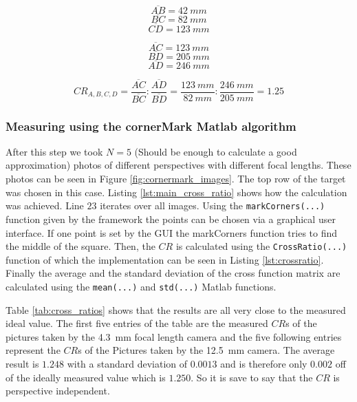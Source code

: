 \documentclass[
a4paper,     %
12pt         %
]{scrartcl}  %
\begin{document}
\begin{minipage}{0.48\textwidth}
  $$\overline{AB} = \SI{42}{mm}$$
  $$\overline{BC} = \SI{82}{mm}$$
  $$\overline{CD} = \SI{123}{mm}$$
\end{minipage}
\begin{minipage}{0.48\textwidth}
  $$\overline{AC} = \SI{123}{mm}$$
  $$\overline{BD} = \SI{205}{mm}$$
  $$\overline{AD} = \SI{246}{mm}$$
\end{minipage}

\hspace{0.5mm}

\begin{equation}
 CR_{A,B,C,D} = \frac{\overline{AC}}{\overline{BC}} : \frac{\overline{AD}}{\overline{BD}} = \frac{\SI{123}{mm}}{\SI{82}{mm}} : \frac{\SI{246}{mm}}{\SI{205}{mm}} = 1.25
 \label{eq:measure_by_hand}
\end{equation}

\subsubsection{Measuring using the cornerMark Matlab algorithm}

After this step we took $N = 5$ (Should be enough to calculate a good approximation) photos of different perspectives with different focal lengths.
These photos can be seen in Figure \ref{fig:cornermark_images}.
The top row of the target was chosen in this case.
Listing \ref{lst:main_cross_ratio} shows how the calculation was achieved.
Line $23$ iterates over all images.
Using the \lstinline{markCorners(...)} function given by the framework the points can be chosen via a graphical user interface.
If one point is set by the GUI the markCorners function tries to find the middle of the square.
Then, the $CR$ is calculated using the \lstinline{CrossRatio(...)} function of which the implementation can be seen in Listing \ref{lst:crossratio}.
Finally the average and the standard deviation of the cross function matrix are calculated using the \lstinline{mean(...)} and \lstinline{std(...)} Matlab functions.





Table \ref{tab:cross_ratios} shows that the results are all very close to the measured ideal value.
The first five entries of the table are the measured $CR$s of the pictures taken by the \SI{4.3}{mm} focal length camera and the five following entries represent the $CR$s of the Pictures taken by the \SI{12.5}{mm} camera.
The average result is $1.248$ with a standard deviation of $0.0013$ and is therefore only $0.002$ off of the ideally measured value which is $1.250$.
So it is save to say that the $CR$ is perspective independent.
\end{document}
